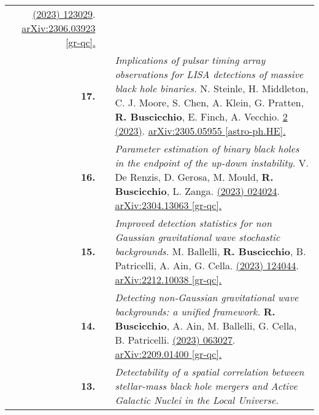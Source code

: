 {\begin{longtable}{rp{0.3cm}p{15.8cm}}
\newline{}
\href{https://journals.aps.org/prd/abstract/10.1103/PhysRevD.108.123029}{\prd 108 (2023) 123029}. \href{https://arxiv.org/abs/2306.03923}{arXiv:2306.03923 [gr-qc].}
\vspace{0.09cm}\\
%
\textbf{17.} & & \textit{Implications of pulsar timing array observations for LISA detections of massive black hole binaries.}
\newline{}
N. Steinle, H. Middleton, C. J. Moore, S. Chen, A. Klein, G. Pratten, \textbf{R. Buscicchio}, E. Finch, A. Vecchio.
\newline{}
\href{https://academic.oup.com/mnras/article/525/2/2851/7244712}{\mnras 525 2 (2023)}. \href{https://arxiv.org/abs/2305.05955}{arXiv:2305.05955 [astro-ph.HE].}
\vspace{0.09cm}\\
%
\textbf{16.} & & \textit{Parameter estimation of binary black holes in the endpoint of the up-down instability.}
\newline{}
V. De Renzis, D. Gerosa, M. Mould, \textbf{R. Buscicchio}, L. Zanga.
\newline{}
\href{https://journals.aps.org/prd/abstract/10.1103/PhysRevD.108.024024}{\prd 108 (2023) 024024}. \href{https://arxiv.org/abs/2304.13063}{arXiv:2304.13063 [gr-qc].}
\vspace{0.09cm}\\
%
\textbf{15.} & & \textit{Improved detection statistics for non Gaussian gravitational wave stochastic backgrounds.}
\newline{}
M. Ballelli, \textbf{R. Buscicchio}, B. Patricelli, A. Ain, G. Cella.
\newline{}
\href{https://journals.aps.org/prd/abstract/10.1103/PhysRevD.107.124044}{\prd 107 (2023) 124044}. \href{https://arxiv.org/abs/2212.10038}{arXiv:2212.10038 [gr-qc].}
\vspace{0.09cm}\\
%
\textbf{14.} & & \textit{Detecting non-Gaussian gravitational wave backgrounds: a unified framework.}
\newline{}
\textbf{R. Buscicchio}, A. Ain, M. Ballelli, G. Cella, B. Patricelli.
\newline{}
\href{https://journals.aps.org/prd/abstract/10.1103/PhysRevD.107.063027}{\prd 107 (2023) 063027}. \href{https://arxiv.org/abs/2209.01400}{arXiv:2209.01400 [gr-qc].}
\vspace{0.09cm}\\
%
\textbf{13.} & & \textit{Detectability of a spatial correlation between stellar-mass black hole mergers and Active Galactic Nuclei in the Local Universe.}

\end{longtable}}
